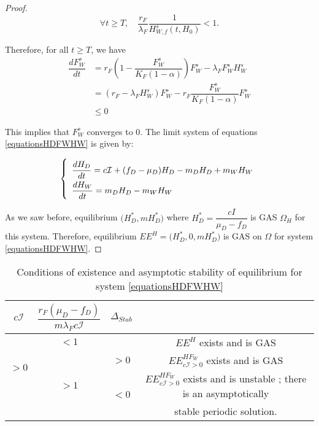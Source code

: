 \documentclass{article}
\newcommand{\lfw}{\lambda_{F}}
\newcommand{\lfw}{\lambda_{F}}
\newcommand{\cI}{c \mathcal{I}}
\begin{document}
\begin{proof}
\begin{equation}
\forall t \geq T, \quad \dfrac{r_F}{\lfw}\dfrac{1}{H_{W, f}^s(t, H_0)} < 1.
\end{equation}

\medskip
Therefore, for all $t \geq T$, we have
\begin{align*}
\dfrac{dF_W^s}{dt} &= r_F \left(1 - \dfrac{F_W^s}{K_F(1-\alpha)} \right) F_W^s - \lfw F_W^s H_W^s \\
&= \left(r_F- \lfw H_W^s\right) F_W^s - r_F \dfrac{F_W^s}{K_F(1-\alpha)}F_W^s \\
& \leq 0
\end{align*}

This implies that $F_W^s$ converges to 0. The limit system of equations \eqref{equationsHDFWHW} is given by:

\begin{equation}
\def\arraystretch{2}
\left\{ \begin{array}{l}
\dfrac{dH_D}{dt}= c\mathcal{I} + (f_D - \mu_D) H_D - m_D H_D + m_W H_W  \\
\dfrac{dH_W}{dt}= m_D H_D - m_W H_W
\end{array}\right.
\end{equation}

As we saw before, equilibrium $\Big(H_D^*, mH_D^*\Big)$ where $H_D^* = \dfrac{cI}{\mu_D - f_D}$ is GAS $\Omega_H$ for this system. Therefore, equilibrium $EE^{H} = \Big(H_D^*, 0, mH_D^*\Big)$ is GAS on $\Omega$ for system \eqref{equationsHDFWHW}.
\end{proof}


\begin{table}[!ht]
\def\arraystretch{2}
\centering
\begin{tabular}{c|c|c|c}
$c\mathcal{I}$ & $\dfrac{r_F(\mu_D-f_D)}{m\lfw c\mathcal{I}} $ & $\Delta_{Stab}$ & \\
\hline
\multirow{3}{*}{$>0$} & $<1$ & &$EE^{H}$ exists and is GAS \\
\cline{2-4}
 & \multirow{3}{*}{$> 1$}  & $>0$ &$EE^{HF_W}_{\cI>0}$ exists and is GAS\\
 \cline{3-4}
 & & \multirow{2}{*}{$ < 0$} & $EE^{HF_W}_{\cI>0}$ exists and is unstable ; there is an asymptotically \\
 & & &  stable periodic solution. \\
\end{tabular}
\caption{\centering Conditions of existence and asymptotic stability of equilibrium for system \eqref{equationsHDFWHW}}
\end{table}
\end{document}
